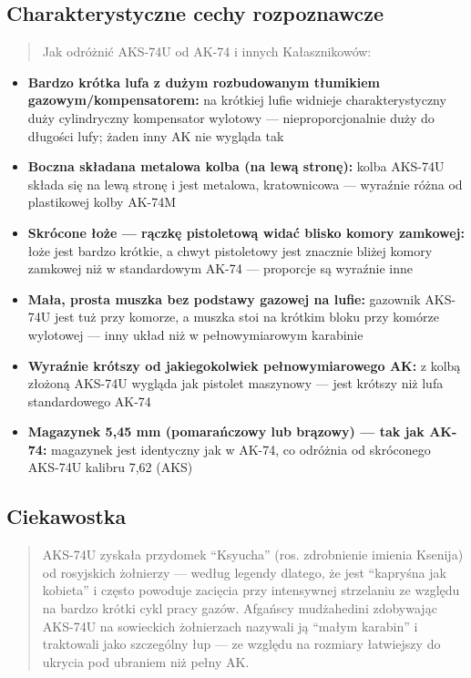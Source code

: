 \documentclass[12pt,oneside]{book}
\providecommand{\tightlist}{%
  \setlength{\itemsep}{0pt}\setlength{\parskip}{0pt}}
\begin{document}
\subsection{Charakterystyczne cechy
rozpoznawcze}\label{charakterystyczne-cechy-rozpoznawcze-60}

\begin{quote}
Jak odróżnić AKS-74U od AK-74 i innych Kałasznikowów:
\end{quote}

\begin{itemize}
\tightlist
\item
  \textbf{Bardzo krótka lufa z dużym rozbudowanym tłumikiem
  gazowym/kompensatorem:} na krótkiej lufie widnieje charakterystyczny
  duży cylindryczny kompensator wylotowy --- nieproporcjonalnie duży do
  długości lufy; żaden inny AK nie wygląda tak
\item
  \textbf{Boczna składana metalowa kolba (na lewą stronę):} kolba
  AKS-74U składa się na lewą stronę i jest metalowa, kratownicowa ---
  wyraźnie różna od plastikowej kolby AK-74M
\item
  \textbf{Skrócone łoże --- rączkę pistoletową widać blisko komory
  zamkowej:} łoże jest bardzo krótkie, a chwyt pistoletowy jest znacznie
  bliżej komory zamkowej niż w standardowym AK-74 --- proporcje są
  wyraźnie inne
\item
  \textbf{Mała, prosta muszka bez podstawy gazowej na lufie:} gazownik
  AKS-74U jest tuż przy komorze, a muszka stoi na krótkim bloku przy
  komórze wylotowej --- inny układ niż w pełnowymiarowym karabinie
\item
  \textbf{Wyraźnie krótszy od jakiegokolwiek pełnowymiarowego AK:} z
  kolbą złożoną AKS-74U wygląda jak pistolet maszynowy --- jest krótszy
  niż lufa standardowego AK-74
\item
  \textbf{Magazynek 5,45 mm (pomarańczowy lub brązowy) --- tak jak
  AK-74:} magazynek jest identyczny jak w AK-74, co odróżnia od
  skróconego AKS-74U kalibru 7,62 (AKS)
\end{itemize}

\subsection{Ciekawostka}\label{ciekawostka-60}

\begin{quote}
AKS-74U zyskała przydomek ``Ksyucha'' (ros. zdrobnienie imienia Ksenija)
od rosyjskich żołnierzy --- według legendy dlatego, że jest ``kapryśna
jak kobieta'' i często powoduje zacięcia przy intensywnej strzelaniu ze
względu na bardzo krótki cykl pracy gazów. Afgańscy mudżahedini
zdobywając AKS-74U na sowieckich żołnierzach nazywali ją ``małym
karabin'' i traktowali jako szczególny łup --- ze względu na rozmiary
łatwiejszy do ukrycia pod ubraniem niż pełny AK.
\end{quote}
\end{document}

